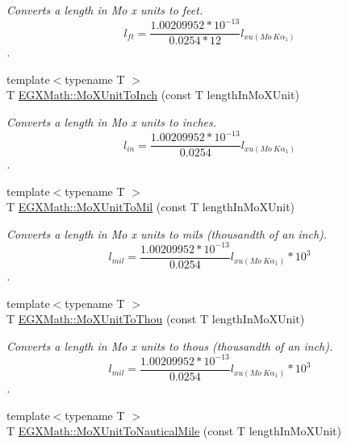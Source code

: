 \begin{DoxyCompactItemize}
\begin{DoxyCompactList}\small\item\em Converts a length in Mo x units to feet. \[ l_{ft}= \frac{1.00209952*10^{-13}}{0.0254 * 12} l_{xu(Mo\ K\alpha_1)} \]. \end{DoxyCompactList}\item 
{\footnotesize template$<$typename T $>$ }\\T \mbox{\hyperlink{group___e_g_x_math-_conversions-_length_conversions-_non-_s_i-_mo_x_unit-_imperial_ga98ea06a1705222e038de1b19f8bfbe4b}{E\+G\+X\+Math\+::\+Mo\+X\+Unit\+To\+Inch}} (const T length\+In\+Mo\+X\+Unit)
\begin{DoxyCompactList}\small\item\em Converts a length in Mo x units to inches. \[ l_{in}= \frac{1.00209952*10^{-13}}{0.0254} l_{xu(Mo\ K\alpha_1)} \]. \end{DoxyCompactList}\item 
{\footnotesize template$<$typename T $>$ }\\T \mbox{\hyperlink{group___e_g_x_math-_conversions-_length_conversions-_non-_s_i-_mo_x_unit-_imperial_gaa73c49ecabd4f9db771fac592ff7449a}{E\+G\+X\+Math\+::\+Mo\+X\+Unit\+To\+Mil}} (const T length\+In\+Mo\+X\+Unit)
\begin{DoxyCompactList}\small\item\em Converts a length in Mo x units to mils (thousandth of an inch). \[ l_{mil}= \frac{1.00209952*10^{-13}}{0.0254} l_{xu(Mo\ K\alpha_1)} * 10^{3} \]. \end{DoxyCompactList}\item 
{\footnotesize template$<$typename T $>$ }\\T \mbox{\hyperlink{group___e_g_x_math-_conversions-_length_conversions-_non-_s_i-_mo_x_unit-_imperial_gae18fc1fb7d5238fe185b85084b95b2b0}{E\+G\+X\+Math\+::\+Mo\+X\+Unit\+To\+Thou}} (const T length\+In\+Mo\+X\+Unit)
\begin{DoxyCompactList}\small\item\em Converts a length in Mo x units to thous (thousandth of an inch). \[ l_{mil}= \frac{1.00209952*10^{-13}}{0.0254} l_{xu(Mo\ K\alpha_1)} * 10^{3} \]. \end{DoxyCompactList}\item 
{\footnotesize template$<$typename T $>$ }\\T \mbox{\hyperlink{group___e_g_x_math-_conversions-_length_conversions-_non-_s_i-_mo_x_unit-_nautical_ga034fe0d8e6dbb0b0a588099a5b9d2c51}{E\+G\+X\+Math\+::\+Mo\+X\+Unit\+To\+Nautical\+Mile}} (const T length\+In\+Mo\+X\+Unit)

\end{DoxyCompactItemize}
